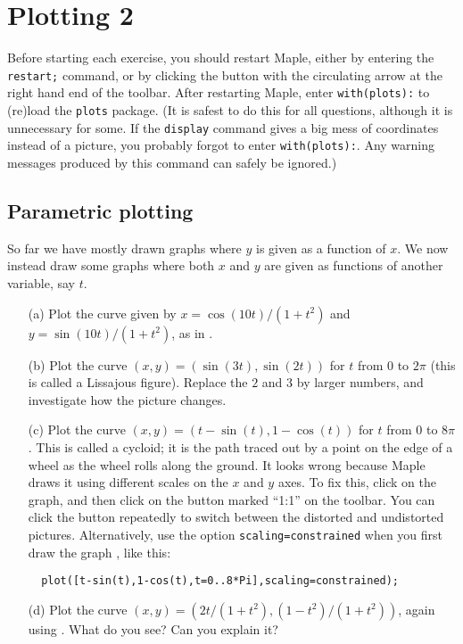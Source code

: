 \documentclass[a4paper,10pt]{amsbook}
\numberwithin{example}{chapter}
\begin{document}
\chapter{Plotting 2}

Before starting each exercise, you should restart Maple, either by
entering the \verb~restart;~ command, or by clicking the button with
the circulating arrow at the right hand end of the toolbar.  After
restarting Maple, enter \verb~with(plots):~ to (re)load the
\verb~plots~ package.  (It is safest to do this for all questions,
although it is unnecessary for some.  If the \verb~display~ command
gives a big mess of coordinates instead of a picture, you probably
forgot to enter \verb~with(plots):~.  Any warning messages produced by
this command can safely be ignored.)

\section{Parametric plotting}

So far we have mostly drawn graphs where $y$ is given as a function of
$x$.  We now instead draw some graphs where both $x$ and $y$ are given
as functions of another variable, say $t$.

\begin{exercise}
 \begin{itemize}
  \item[(a)]
   Plot the curve given by $x=\cos(10t)/(1+t^2)$ and $y=\sin(10t)/(1+t^2)$,
   as in \note{\NOTEparametric,\NOTEparametricbrackets}.
  \item[(b)]
   Plot the curve $(x,y)=(\sin(3t),\sin(2t))$ for $t$ from $0$ to
   $2\pi$ (this is called a Lissajous figure).  Replace the $2$ and
   $3$ by larger numbers, and investigate how the picture changes.
  \item[(c)]
   Plot the curve $(x,y)=(t-\sin(t),1-\cos(t))$ for $t$ from $0$ to
   $8\pi$.  This is called a cycloid; it is the path traced out by a
   point on the edge of a wheel as the wheel rolls along the ground.
   It looks wrong because Maple draws it using different scales on the
   $x$ and $y$ axes.  To fix this, click on the graph, and then click
   on the button marked ``1:1'' on the toolbar.  You can click the
   button repeatedly to switch between the distorted and undistorted
   pictures.  Alternatively, use the option \verb~scaling=constrained~
   when you first draw the graph \note{\NOTEscaling}, like this:
\begin{verbatim}
  plot([t-sin(t),1-cos(t),t=0..8*Pi],scaling=constrained);
\end{verbatim}
  \item[(d)] Plot the curve
   $(x,y)=(2t/(1+t^2),(1-t^2)/(1+t^2))$, again using
   \note{\NOTEparametric}.  What do you see?  Can you
   explain it?
 \end{itemize}
\end{exercise}
\end{document}
